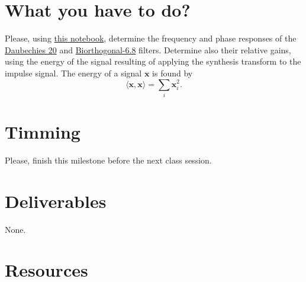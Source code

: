\section{What you have to do?}

Please, using
\href{https://github.com/Sistemas-Multimedia/Sistemas-Multimedia.github.io/blob/master/milestones/07-DWT/dwt_filters_analysis.ipynb}{this
  notebook}, determine the frequency and phase responses of the
\href{http://wavelets.pybytes.com/wavelet/db20/}{Daubechies 20} and
\href{http://wavelets.pybytes.com/wavelet/bior6.8/}{Biorthogonal-6.8}
filters. Determine also their relative gains, using the energy of the
signal resulting of applying the synthesis transform to the impulse
signal. The energy of a signal ${\mathbf x}$ is found by
\begin{equation}
  \langle {\mathbf x}, {\mathbf x}\rangle =  \sum_{i}{{\mathbf x}_i^2}.
\end{equation}

\section{Timming}

Please, finish this milestone before the next class session.

\section{Deliverables}

None.

\section{Resources}

\renewcommand{\addcontentsline}[3]{}%

